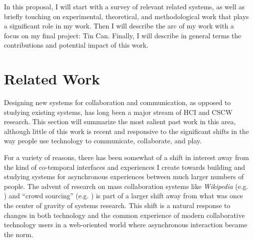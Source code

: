 \documentclass{tufte-handout}
\begin{document}


In this proposal, I will start with a survey of relevant related systems, as well as briefly touching on experimental, theoretical, and methodological work that plays a significant role in my work. Then I will describe the arc of my  work with a focus on my final project: Tin Can. Finally, I will describe in general terms the contributions and potential impact of this work.



\section{Related Work}

Designing new systems for collaboration and communication, as opposed to studying existing systems, has long been a major stream of HCI and CSCW research. This section will summarize the most salient past work in this area, although little of this work is recent and responsive to the significant shifts in the way people use technology to communicate, collaborate, and play. 

For a variety of reasons, there has been somewhat of a shift in interest away from the kind of co-temporal interfaces and experiences I create towards building and studying systems for asynchronous experiences between much larger numbers of people. The advent of research on mass collaboration systems like \emph{Wikipedia} (e.g. \citep{Kittur:2007up}) and ``crowd sourcing'' (e.g. \citep{Bernstein:2010wk}) is part of a larger shift away from what was once the center of gravity of systems research. This shift is a natural response to changes in both technology and the common experience of modern collaborative technology users in a web-oriented world where asynchronous interaction became the norm.
\end{document}
